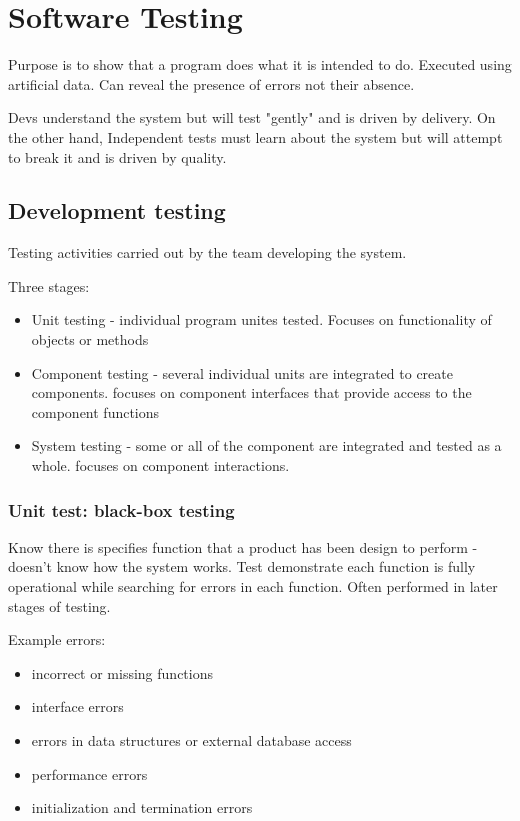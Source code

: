 \documentclass{article}
\begin{document}
    \section*{Software Testing}

    Purpose is to show that a program does what it is intended to do. Executed using 
    artificial data. Can reveal the presence of errors not their absence.

    Devs understand the system but will test "gently" and is driven by delivery. On the 
    other hand, Independent tests must learn about the system but will attempt to break it 
    and is driven by quality.

    \subsection*{Development testing}

    Testing activities carried out by the team developing the system.

    Three stages:
    \begin{itemize}
        \item Unit testing - individual program unites tested. Focuses on functionality of 
        objects or methods 
        \item Component testing - several individual units are integrated to create 
        components. focuses on component interfaces that provide access to the component 
        functions
        \item System testing - some or all of the component are integrated and tested as 
        a whole. focuses on component interactions.
    \end{itemize}

    \subsubsection*{Unit test: black-box testing}

    Know there is specifies function that a product has been design to perform - doesn't 
    know how the system works. Test demonstrate each function is fully operational 
    while searching for errors in each function. Often performed in later stages of testing.

    Example errors:
    \begin{itemize}
        \item incorrect or missing functions 
        \item interface errors 
        \item errors in data structures or external database access 
        \item performance errors 
        \item initialization and termination errors 
    \end{itemize}
\end{document}
